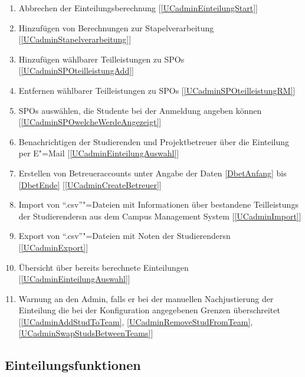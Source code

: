 \documentclass[parskip=full]{scrartcl}
\newcommand{\swtLabel}[1]{\textbf{/#1\arabic*0/}}
\newcommand{\testRef}[1]{[\ref{#1}]}
\begin{document}
\begin{enumerate}[label=\swtLabel{FA}, resume]
  \item Abbrechen der Einteilungsberechnung \label{FAabbruch} \testRef{UCadminEinteilungStart}
  \item Hinzufügen von Berechnungen zur Stapelverarbeitung \label{FAadminStapel}
  \testRef{UCadminStapelverarbeitung}
  \item Hinzufügen wählbarer Teilleistungen zu \glspl{SPO}
  \label{FAadminSPOhinzufügen} \testRef{UCadminSPOteilleistungAdd}
  \item Entfernen wählbarer Teilleistungen zu \glspl{SPO}
  \label{FAadminSPOentfernen} \testRef{UCadminSPOteilleistungRM}
  \item \glspl{SPO} auswählen, die Studente bei der Anmeldung angeben können
  \label{FAadminSPOAuswahl} \testRef{UCadminSPOwelcheWerdeAngezeigt}
  \item Benachrichtigen der Studierenden und Projektbetreuer über die Einteilung
  per E"=Mail \label{FAadminBenachrichtigen} \testRef{UCadminEinteilungAuswahl}
  \item Erstellen von Betreueraccounts unter Angabe der Daten \ref{DbetAnfang}
  bis \ref{DbetEnde}
  \label{FAadminCreateAccounts}
  \testRef{UCadminCreateBetreuer}
  \item Import von \enquote{.csv}"=Dateien mit Informationen über bestandene
  \glspl{Teilleistung} der \glspl{Studierender}n aus dem Campus Management System 
  \label{FAimport2} \testRef{UCadminImport}
  \item Export von \enquote{.csv}"=Dateien mit Noten der \glspl{Studierender}n
  \label{FAexport2} \testRef{UCadminExport}
  \item Übersicht über bereits berechnete Einteilungen
  \label{FAadminUebersichtAlleEinteilungen} \testRef{UCadminEinteilungAuswahl}
  \item Warnung an den \gls{Admin}, falls er bei der manuellen Nachjustierung 
  der Einteilung die bei der Konfiguration angegebenen Grenzen überschreitet
  \label{FAadminWarnung} [\ref{UCadminAddStudToTeam},
  \ref{UCadminRemoveStudFromTeam}, \ref{UCadminSwapStudsBetweenTeams}]
\end{enumerate}

\subsection{Einteilungsfunktionen}
\end{document}
